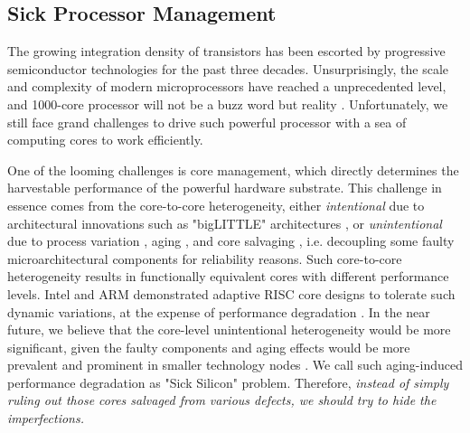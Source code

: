 \subsection{Sick Processor Management}
The growing integration density of transistors has been escorted by progressive semiconductor technologies for the past three decades. Unsurprisingly, the scale and complexity of modern microprocessors have reached a unprecedented level, and 1000-core processor will not be a buzz word but reality \cite{thousandcore}.  Unfortunately, we still face grand challenges to drive such powerful processor with a sea of computing cores to work efficiently.

One of the looming challenges is core management, which directly determines the harvestable performance of the powerful hardware substrate.  This challenge in essence comes from the core-to-core heterogeneity, either \emph{intentional} due to architectural innovations such as "bigLITTLE" architectures \cite{biglittle}, or \emph{unintentional} due to process variation \cite{variation_jssc02} \cite{ParameterVariations_DAC03}, aging \cite{ImpactTechnologyScaling_04} \cite{aging_iedm} \cite{degradation_05} \cite{ReviveNet}, and core salvaging \cite{shivakumar2003exploiting} \cite{WearoutRecovery_08}, i.e. decoupling some faulty microarchitectural components for reliability reasons. Such core-to-core heterogeneity results in functionally equivalent cores with different performance levels. Intel and ARM demonstrated adaptive RISC core designs to tolerate such dynamic variations, at the expense of performance degradation \cite{tschanz201045nm} \cite{arm-timing-error}. In the near future, we believe that the core-level unintentional heterogeneity would be more significant, given the faulty components and aging effects would be more prevalent and prominent in smaller technology nodes \cite{degradation_05}.  We call such aging-induced performance degradation as "Sick Silicon" problem. Therefore, \emph{instead of simply ruling out those cores salvaged from various defects, we should try to hide the imperfections.}


